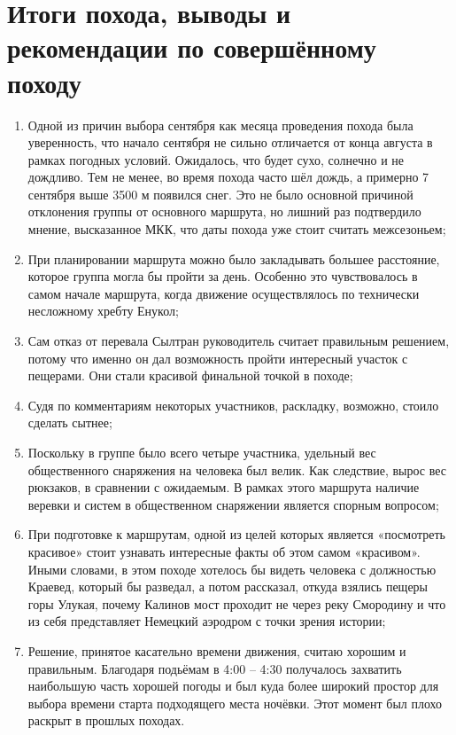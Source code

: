 \section{Итоги похода, выводы и рекомендации по совершённому походу}

	\begin{enumerate}
		\item Одной из причин выбора сентября как месяца проведения похода была уверенность, что начало сентября не сильно отличается от конца августа в рамках погодных условий. Ожидалось, что будет сухо, солнечно и не дождливо. Тем не менее, во время похода часто шёл дождь, а примерно 7 сентября выше 3500 м появился снег. Это не было основной причиной отклонения группы от основного маршрута, но лишний раз подтвердило мнение, высказанное МКК, что даты похода уже стоит считать межсезоньем; %
		\item ﻿﻿﻿При планировании маршрута можно было закладывать большее расстояние, которое группа могла бы пройти за день. Особенно это чувствовалось в самом начале маршрута, когда движение осуществлялось по технически несложному хребту Енукол;
		\item ﻿﻿﻿Сам отказ от перевала Сылтран руководитель считает правильным решением, %
		 потому что именно он дал возможность пройти интересный участок с пещерами. Они стали красивой финальной точкой в походе;
		\item ﻿﻿﻿Судя по комментариям некоторых участников, раскладку, возможно, стоило сделать сытнее;
		﻿\item ﻿﻿Поскольку в группе было всего четыре участника, удельный вес общественного снаряжения на человека был велик. Как следствие, вырос вес рюкзаков, в сравнении с ожидаемым. В рамках этого маршрута наличие веревки и систем %
		в общественном снаряжении является спорным вопросом;
		\item ﻿﻿﻿При подготовке к маршрутам, одной из целей которых является «посмотреть красивое» стоит узнавать интересные факты об этом самом «красивом». Иными словами, в этом походе хотелось бы видеть человека с должностью Краевед, который бы разведал, а потом рассказал, откуда взялись пещеры горы Улукая, почему Калинов мост проходит не через реку Смородину и что из себя представляет Немецкий аэродром с точки зрения истории;
		\item ﻿﻿﻿Решение, принятое касательно времени движения, считаю хорошим и правильным. Благодаря подьёмам в 4:00 -- 4:30 получалось захватить наибольшую часть хорошей погоды и был куда более широкий простор для выбора времени старта подходящего места ночёвки. Этот момент был плохо раскрыт в прошлых походах. %
		
	\end{enumerate} 

	\clearpage